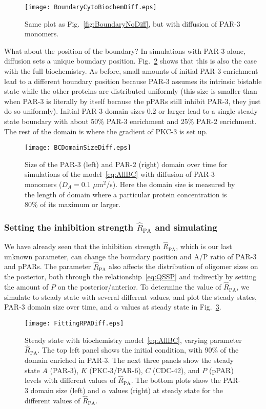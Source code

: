 \documentclass[11pt]{article}
\newcommand{\6}[1]{#1_{\text{6}}}
\newcommand{\3}[1]{#1_{\text{3}}}
\begin{document}
\begin{figure}
\centering
\texttt{[image: BoundaryCytoBiochemDiff.eps]}
\caption{\label{fig:BoundaryDiff}Same plot as Fig.\ \ref{fig:BoundaryNoDiff}, but with diffusion of PAR-3 monomers. }
\end{figure}

What about the position of the boundary? In simulations with PAR-3 alone, diffusion sets a unique boundary position. Fig.\ \ref{fig:BCDSD} shows that this is also the case with the full biochemistry. As before, small amounts of initial PAR-3 enrichment lead to a different boundary position because PAR-3 assumes its intrinsic bistable state while the other proteins are distributed uniformly (this size is smaller than when PAR-3 is literally by itself because the pPARs still inhibit PAR-3, they just do so uniformly). Initial PAR-3 domain sizes 0.2 or larger lead to a single steady state boundary with about 50\% PAR-3 enrichment and 25\% PAR-2 enrichment. The rest of the domain is where the gradient of PKC-3 is set up.

\begin{figure}
\centering
\texttt{[image: BCDomainSizeDiff.eps]}
\caption{\label{fig:BCDSD} Size of the PAR-3 (left) and PAR-2 (right) domain over time for simulations of the model\ \eqref{eq:AllBC} with diffusion of PAR-3 monomers ($D_A=0.1$ $\mu$m$^2$/s). Here the domain size is measured by the length of domain where a particular protein concentration is 80\% of its maximum or larger. }
\end{figure}


\subsubsection{Setting the inhibition strength $\hat R_\text{PA}$ and simulating}
We have already seen that the inhibition strength $\hat R_\text{PA}$, which is our last unknown parameter, can change the boundary position and A/P ratio of PAR-3 and pPARs. The parameter $\hat R_\text{PA}$ also affects the distribution of oligomer sizes on the posterior, both through the relationship\ \eqref{eq:QSSP} and indirectly by setting the amount of $P$ on the posterior/anterior. To determine the value of $\hat R_\text{PA}$, we simulate to steady state with several different values, and plot the steady states, PAR-3 domain size over time, and $\alpha$ values at steady state in Fig.\ \ref{fig:BCSS}. 

\begin{figure}
\centering
\texttt{[image: FittingRPADiff.eps]}
\caption{\label{fig:BCSS}Steady state with biochemistry model\ \eqref{eq:AllBC}, varying parameter $\hat R_\text{PA}$. The top left panel shows the initial condition, with 90\% of the domain enriched in PAR-3. The next three panels show the steady state $A$ (PAR-3), $K$ (PKC-3/PAR-6), $C$ (CDC-42), and $P$ (pPAR) levels with different values of $\hat R_\text{PA}$. The bottom plots show the PAR-3 domain size (left) and $\alpha$ values (right) at steady state for the different values of $\hat R_\text{PA}$. }
\end{figure}
\end{document}
